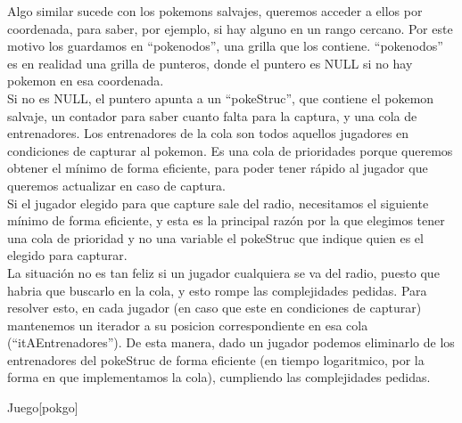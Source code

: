 \begin{Representacion}
Algo similar sucede con los pokemons salvajes, queremos acceder a ellos por coordenada, para saber, por ejemplo, si hay alguno en un rango cercano. Por este motivo los guardamos en ``pokenodos'', una grilla que los contiene. ``pokenodos'' es en realidad una grilla de punteros, donde el puntero es NULL si no hay pokemon en esa coordenada.\\
Si no es NULL, el puntero apunta a un ``pokeStruc'', que contiene el pokemon salvaje, un contador para saber cuanto falta para la captura, y una cola de entrenadores. Los entrenadores de la cola son todos aquellos jugadores en condiciones de capturar al pokemon. Es una cola de prioridades porque queremos obtener el m\'inimo de forma eficiente, para poder tener r\'apido al jugador que queremos actualizar en caso de captura. \\

Si el jugador elegido para que capture sale del radio, necesitamos el siguiente m\'inimo de forma eficiente, y esta es la principal raz\'on por la que elegimos tener una cola de prioridad y no una variable el pokeStruc que indique quien es el elegido para capturar. \\

La situaci\'on no es tan feliz si un jugador cualquiera se va del radio, puesto que habria que buscarlo en la cola, y esto rompe las complejidades pedidas. Para resolver esto, en cada jugador (en caso que este en condiciones de capturar) mantenemos un iterador a su posicion correspondiente en esa cola (``itAEntrenadores''). De esta manera, dado un jugador podemos eliminarlo de los entrenadores del pokeStruc de forma eficiente (en tiempo logaritmico, por la forma en que implementamos la cola), cumpliendo las complejidades pedidas.\\


\begin{Estructura}{Juego}[pokgo]

\begin{Tupla}[pokgo]  
\end{Tupla}
\end{Estructura}


\end{Representacion}
